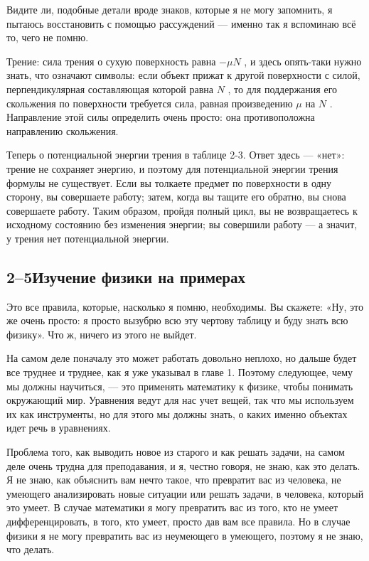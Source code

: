 \documentclass[11pt,oneside]{article}
\begin{document}
Видите ли, подобные детали вроде знаков, которые я не могу запомнить, я пытаюсь восстановить с помощью рассуждений --- именно так я вспоминаю всё то, чего не помню.\par

Трение: сила трения о сухую поверхность равна \(-\mu N\) , и здесь опять-таки нужно знать, что означают символы: если объект прижат к другой поверхности с силой, перпендикулярная составляющая которой равна \(N\) , то для поддержания его скольжения по поверхности требуется сила, равная произведению \(\mu\) на \(N\) . Направление этой силы определить очень просто: она противоположна направлению скольжения.\par

Теперь о потенциальной энергии трения в таблице 2-3. Ответ здесь --- «нет»: трение не сохраняет энергию, и поэтому для потенциальной энергии трения формулы не существует. Если вы толкаете предмет по поверхности в одну сторону, вы совершаете работу; затем, когда вы тащите его обратно, вы снова совершаете работу. Таким образом, пройдя полный цикл, вы не возвращаетесь к исходному состоянию без изменения энергии; вы совершили работу --- а значит, у трения нет потенциальной энергии.\par

\subsection*{2--5Изучение физики на примерах}

Это все правила, которые, насколько я помню, необходимы. Вы скажете: «Ну, это же очень просто: я просто вызубрю всю эту чертову таблицу и буду знать всю физику». Что ж, ничего из этого не выйдет.\par

На самом деле поначалу это может работать довольно неплохо, но дальше будет все труднее и труднее, как я уже указывал в главе 1. Поэтому следующее, чему мы должны научиться, --- это применять математику к физике, чтобы понимать окружающий мир. Уравнения ведут для нас учет вещей, так что мы используем их как инструменты, но для этого мы должны знать, о каких именно объектах идет речь в уравнениях.\par

Проблема того, как выводить новое из старого и как решать задачи, на самом деле очень трудна для преподавания, и я, честно говоря, не знаю, как это делать. Я не знаю, как объяснить вам нечто такое, что превратит вас из человека, не умеющего анализировать новые ситуации или решать задачи, в человека, который это умеет. В случае математики я могу превратить вас из того, кто не умеет дифференцировать, в того, кто умеет, просто дав вам все правила. Но в случае физики я не могу превратить вас из неумеющего в умеющего, поэтому я не знаю, что делать.\par
\end{document}
